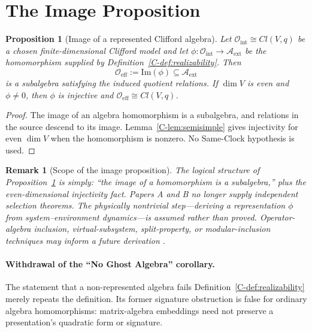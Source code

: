 \documentclass[12pt,a4paper,openany]{book}
\newtheorem{proposition}[theorem]{Proposition}
\newtheorem{remark}[theorem]{Remark}
\begin{document}
\section{The Image Proposition}
\label{C-sec:closure}

\begin{proposition}[Image of a represented Clifford algebra]
\label{C-prop:image}
Let $\mathcal{O}_{\mathrm{int}}\cong Cl(V,q)$ be a chosen finite-dimensional Clifford model and let $\phi:\mathcal O_{\mathrm{int}}\to\mathcal A_{\mathrm{ext}}$ be the homomorphism supplied by Definition~\ref{C-def:realizability}.  Then
\begin{equation}
    \mathcal{O}_{\mathrm{eff}} := \mathrm{Im}(\phi) \subseteq \mathcal{A}_{\mathrm{ext}}
\end{equation}
is a subalgebra satisfying the induced quotient relations.  If $\dim V$ is even and $\phi\ne0$, then $\phi$ is injective and $\mathcal O_{\mathrm{eff}}\cong Cl(V,q)$.
\end{proposition}

\begin{proof}
The image of an algebra homomorphism is a subalgebra, and relations in the source descend to its image.  Lemma~\ref{C-lem:semisimple} gives injectivity for even $\dim V$ when the homomorphism is nonzero.  No Same-Clock hypothesis is used.
\end{proof}

\begin{remark}[Scope of the image proposition]
\label{C-rem:scope}
The logical structure of Proposition~\ref{C-prop:image} is simply: ``the image of a homomorphism is a subalgebra,'' plus the even-dimensional injectivity fact.  Papers A and B no longer supply independent selection theorems.  The physically nontrivial step---deriving a representation $\phi$ from system--environment dynamics---is assumed rather than proved.  Operator-algebra inclusion, virtual-subsystem, split-property, or modular-inclusion techniques may inform a future derivation \cite{Zanardi2001,DoplicherLongo1984,Wiesbrock1993}.
\end{remark}

\paragraph{Withdrawal of the ``No Ghost Algebra'' corollary.}
The statement that a non-represented algebra fails Definition~\ref{C-def:realizability} merely repeats the definition.  Its former signature obstruction is false for ordinary algebra homomorphisms: matrix-algebra embeddings need not preserve a presentation's quadratic form or signature.
\end{document}
